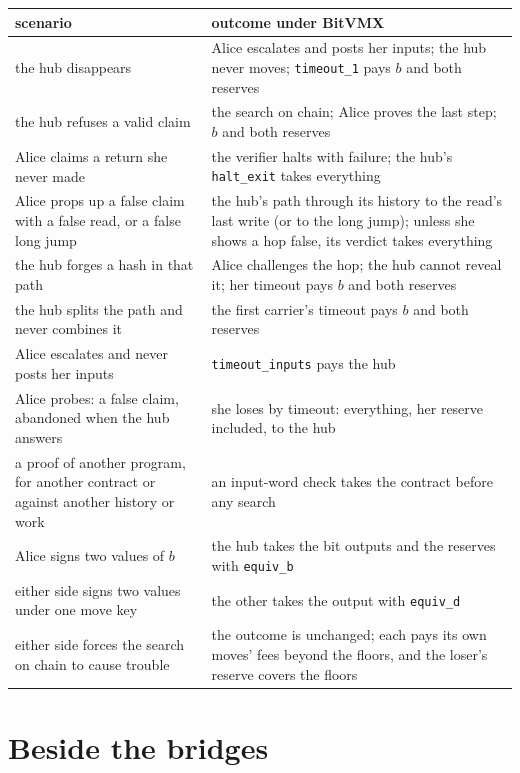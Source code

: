 \documentclass[11pt]{article}
\newcommand{\tx}[1]{\texttt{#1}}
\begin{document}
\begin{center}
\small
\begin{tabularx}{\linewidth}{p{58mm}L}
\toprule
scenario & outcome under BitVMX \\
\midrule
the hub disappears & Alice escalates and posts her inputs; the hub never moves; \tx{timeout\_1} pays $b$ and both reserves \\
the hub refuses a valid claim & the search on chain; Alice proves the last step; $b$ and both reserves \\
Alice claims a return she never made & the verifier halts with failure; the hub's \tx{halt\_exit} takes everything \\
Alice props up a false claim with a false read, or a false long jump & the hub's path through its history to the read's last write (or to the long jump); unless she shows a hop false, its verdict takes everything \\
the hub forges a hash in that path & Alice challenges the hop; the hub cannot reveal it; her timeout pays $b$ and both reserves \\
the hub splits the path and never combines it & the first carrier's timeout pays $b$ and both reserves \\
Alice escalates and never posts her inputs & \tx{timeout\_inputs} pays the hub \\
Alice probes: a false claim, abandoned when the hub answers & she loses by timeout: everything, her reserve included, to the hub \\
a proof of another program, for another contract or against another history or work & an input-word check takes the contract before any search \\
Alice signs two values of $b$ & the hub takes the bit outputs and the reserves with \tx{equiv\_b} \\
either side signs two values under one move key & the other takes the output with \tx{equiv\_d} \\
either side forces the search on chain to cause trouble & the outcome is unchanged; each pays its own moves' fees beyond the floors, and the loser's reserve covers the floors \\
\bottomrule
\end{tabularx}
\end{center}

\section{Beside the bridges}
\label{sec:bridges}
\end{document}
